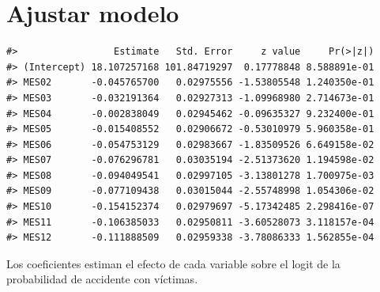 \documentclass[
  spanish,
  10.5pt,
  letterpaper,
  openany,
  headings=big]{scrbook}
\newenvironment{Shaded}{}{}
\newcommand{\AttributeTok}[1]{\textcolor[rgb]{0.84,0.23,0.29}{#1}}
\newcommand{\ControlFlowTok}[1]{\textcolor[rgb]{0.84,0.23,0.29}{#1}}
\newcommand{\DecValTok}[1]{\textcolor[rgb]{0.00,0.36,0.77}{#1}}
\newcommand{\FunctionTok}[1]{\textcolor[rgb]{0.44,0.26,0.76}{#1}}
\newcommand{\NormalTok}[1]{\textcolor[rgb]{0.14,0.16,0.18}{#1}}
\newcommand{\OtherTok}[1]{\textcolor[rgb]{0.44,0.26,0.76}{#1}}
\newcommand{\SpecialCharTok}[1]{\textcolor[rgb]{0.00,0.36,0.77}{#1}}
\newcommand{\StringTok}[1]{\textcolor[rgb]{0.01,0.18,0.38}{#1}}
\begin{document}
\section{Ajustar modelo}\label{ajustar-modelo}

\begin{Shaded}
\end{Shaded}

\begin{verbatim}
#>                 Estimate   Std. Error     z value     Pr(>|z|)
#> (Intercept) 18.107257168 101.84719297  0.17778848 8.588891e-01
#> MES02       -0.045765700   0.02975556 -1.53805548 1.240350e-01
#> MES03       -0.032191364   0.02927313 -1.09968980 2.714673e-01
#> MES04       -0.002838049   0.02945462 -0.09635327 9.232400e-01
#> MES05       -0.015408552   0.02906672 -0.53010979 5.960358e-01
#> MES06       -0.054753129   0.02983667 -1.83509526 6.649158e-02
#> MES07       -0.076296781   0.03035194 -2.51373620 1.194598e-02
#> MES08       -0.094049541   0.02997105 -3.13801278 1.700975e-03
#> MES09       -0.077109438   0.03015044 -2.55748998 1.054306e-02
#> MES10       -0.154152374   0.02979697 -5.17342485 2.298416e-07
#> MES11       -0.106385033   0.02950811 -3.60528073 3.118157e-04
#> MES12       -0.111888509   0.02959338 -3.78086333 1.562855e-04
\end{verbatim}

\begin{tcolorbox}[enhanced jigsaw, arc=.35mm, bottomrule=.15mm, bottomtitle=1mm, breakable, colback=white, colbacktitle=quarto-callout-tip-color!10!white, colframe=quarto-callout-tip-color-frame, coltitle=black, left=2mm, leftrule=.75mm, opacityback=0, opacitybacktitle=0.6, rightrule=.15mm, title=\textcolor{quarto-callout-tip-color}{\faLightbulb}\hspace{0.5em}{Interpretación del resultado}, titlerule=0mm, toprule=.15mm, toptitle=1mm]

Los coeficientes estiman el efecto de cada variable sobre el logit de la
probabilidad de accidente con víctimas.

\end{tcolorbox}
\end{document}

